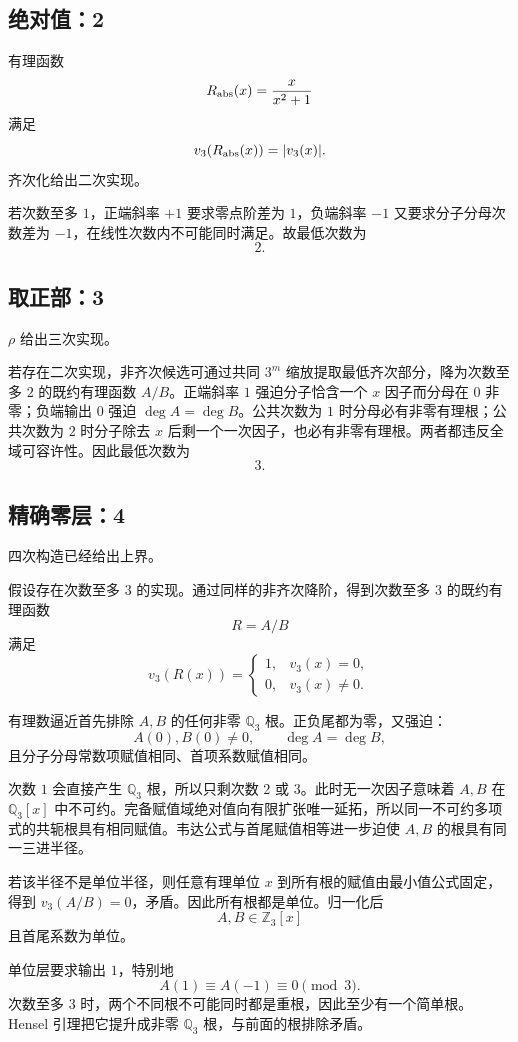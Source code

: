 \documentclass[11pt,a4paper]{ctexart}
\begin{document}
\subsection{绝对值：2}
有理函数
\[
R_{\rm abs}(x)=\frac{x}{x^2+1}
\]
满足
\[
v_3(R_{\rm abs}(x))=|v_3(x)|.
\]
齐次化给出二次实现。

若次数至多 \(1\)，正端斜率 \(+1\) 要求零点阶差为 \(1\)，负端斜率 \(-1\) 又要求分子分母次数差为 \(-1\)，在线性次数内不可能同时满足。故最低次数为
\[
\boxed2.
\]

\subsection{取正部：3}
\(\rho\) 给出三次实现。

若存在二次实现，非齐次候选可通过共同 \(3^m\) 缩放提取最低齐次部分，降为次数至多 \(2\) 的既约有理函数 \(A/B\)。正端斜率 \(1\) 强迫分子恰含一个 \(x\) 因子而分母在 \(0\) 非零；负端输出 \(0\) 强迫 \(\deg A=\deg B\)。公共次数为 \(1\) 时分母必有非零有理根；公共次数为 \(2\) 时分子除去 \(x\) 后剩一个一次因子，也必有非零有理根。两者都违反全域可容许性。因此最低次数为
\[
\boxed3.
\]

\subsection{精确零层：4}
四次构造已经给出上界。

假设存在次数至多 \(3\) 的实现。通过同样的非齐次降阶，得到次数至多 \(3\) 的既约有理函数
\[
R=A/B
\]
满足
\[
v_3(R(x))=
\begin{cases}
1,&v_3(x)=0,\\
0,&v_3(x)\ne0.
\end{cases}
\]

有理数逼近首先排除 \(A,B\) 的任何非零 \(\mathbb Q_3\) 根。正负尾都为零，又强迫：
\[
A(0),B(0)\ne0,\qquad
\deg A=\deg B,
\]
且分子分母常数项赋值相同、首项系数赋值相同。

次数 \(1\) 会直接产生 \(\mathbb Q_3\) 根，所以只剩次数 \(2\) 或 \(3\)。此时无一次因子意味着 \(A,B\) 在 \(\mathbb Q_3[x]\) 中不可约。完备赋值域绝对值向有限扩张唯一延拓，所以同一不可约多项式的共轭根具有相同赋值。韦达公式与首尾赋值相等进一步迫使 \(A,B\) 的根具有同一三进半径。

若该半径不是单位半径，则任意有理单位 \(x\) 到所有根的赋值由最小值公式固定，得到 \(v_3(A/B)=0\)，矛盾。因此所有根都是单位。归一化后
\[
A,B\in\mathbb Z_3[x]
\]
且首尾系数为单位。

单位层要求输出 \(1\)，特别地
\[
A(1)\equiv A(-1)\equiv0\pmod3.
\]
次数至多 \(3\) 时，两个不同根不可能同时都是重根，因此至少有一个简单根。Hensel 引理把它提升成非零 \(\mathbb Q_3\) 根，与前面的根排除矛盾。
\end{document}
